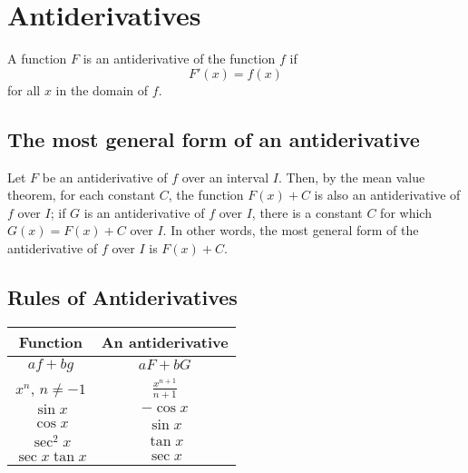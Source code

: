 
\hypertarget{antiderivatives}{%
\section{Antiderivatives}\label{antiderivatives}}

\begin{definition}

A function \(F\) is an antiderivative of the function \(f\) if
\[F'(x)=f(x)\] for all \(x\) in the domain of \(f\).

\end{definition}

\hypertarget{the-most-general-form-of-an-antiderivative}{%
\subsection{The most general form of an
antiderivative}\label{the-most-general-form-of-an-antiderivative}}

Let \(F\) be an antiderivative of \(f\) over an interval \(I\). Then, by
the mean value theorem, for each constant \(C\), the function \(F(x)+C\)
is also an antiderivative of \(f\) over \(I\); if \(G\) is an
antiderivative of \(f\) over \(I\), there is a constant \(C\) for which
\(G(x)=F(x)+C\) over \(I\). In other words, the most general form of the
antiderivative of \(f\) over \(I\) is \(F(x)+C\).





\hypertarget{rules-of-antiderivatives}{%
\subsection{Rules of Antiderivatives}\label{rules-of-antiderivatives}}

\begin{longtable}[]{@{}cc@{}}
\toprule()
Function & An antiderivative \\
\midrule()
\endhead
\(af+bg\) & \(aF+bG\) \\
\(x^n\), \(n\neq -1\) & \(\frac{x^{n+1}}{n+1}\) \\
\(\sin x\) & \(-\cos x\) \\
\(\cos x\) & \(\sin x\) \\
\(\sec^2x\) & \(\tan x\) \\
\(\sec x\tan x\) & \(\sec x\) \\
\bottomrule()
\end{longtable}

